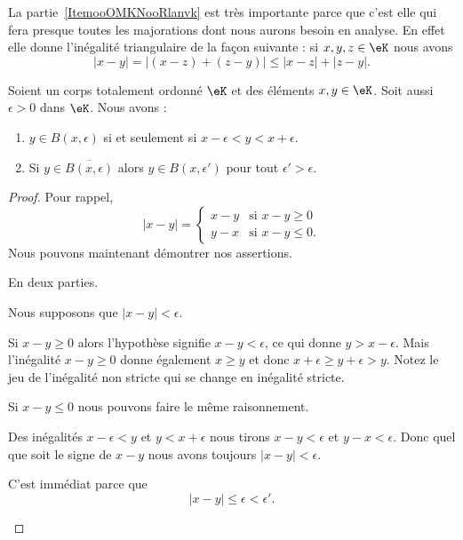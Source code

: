 \begin{remark}      \label{RemooJCAUooKkuglX}
	La partie~\ref{ItemooOMKNooRlanvk} est très importante parce que c'est elle qui fera presque toutes les majorations dont nous aurons besoin en analyse. En effet elle donne l'inégalité triangulaire de la façon suivante : si \( x,y,z\in \eK\) nous avons
	\begin{equation}
		| x-y |= |  (x-z)+(z-y) |\leq | x-z |+| z-y |.
	\end{equation}
\end{remark}

\begin{lemma}       \label{LEMooQXDCooPEABBm}
	Soient un corps totalement ordonné \( \eK\) et des éléments \( x,y\in \eK\). Soit aussi \( \epsilon>0\) dans \( \eK\). Nous avons :
	\begin{enumerate}
		\item       \label{ITEMooXJGVooSebiip}
		      \( y\in B(x,\epsilon)\) si et seulement si \( x-\epsilon<y<x+\epsilon\).
		\item       \label{ITEMooRUBBooRayiMs}
		      Si \( y\in  \overline{ B(x,\epsilon) }  \) alors \( y\in B(x,\epsilon')\) pour tout \( \epsilon'>\epsilon\).
	\end{enumerate}
\end{lemma}

\begin{proof}
	Pour rappel,
	\begin{equation}
		| x-y |=\begin{cases}
			x-y & \text{si } x-y\geq 0  \\
			y-x & \text{si } x-y\leq 0.
		\end{cases}
	\end{equation}
	Nous pouvons maintenant démontrer nos assertions.
	\begin{subproof}
		\spitem[\ref{ITEMooXJGVooSebiip}]
		En deux parties.
		\begin{subproof}
			\spitem[\( \Rightarrow\)]
			Nous supposons que \( | x-y |<\epsilon\).

			Si \( x-y\geq 0\) alors l'hypothèse signifie \( x-y<\epsilon\), ce qui donne \( y>x-\epsilon\). Mais l'inégalité \( x-y\geq 0\) donne également \( x\geq y\) et donc \( x+\epsilon\geq y+\epsilon>y\). Notez le jeu de l'inégalité non stricte qui se change en inégalité stricte.

			Si \( x-y\leq 0\) nous pouvons faire le même raisonnement.

			\spitem[\( \Leftarrow\)]
			Des inégalités \( x-\epsilon<y\) et \( y<x+\epsilon\) nous tirons \( x-y<\epsilon\) et \( y-x<\epsilon\). Donc quel que soit le signe de \( x-y\) nous avons toujours \( | x-y |<\epsilon\).
		\end{subproof}

		\spitem[\ref{ITEMooRUBBooRayiMs}]

		C'est immédiat parce que
		\begin{equation}
			| x-y |\leq \epsilon<\epsilon'.
		\end{equation}
	\end{subproof}
\end{proof}



